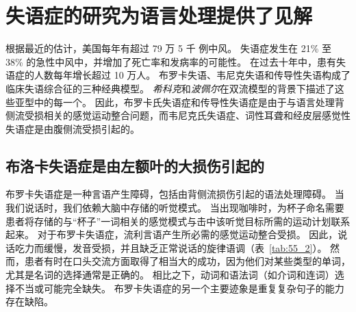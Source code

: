 \section{失语症的研究为语言处理提供了见解}

根据最近的估计，美国每年有超过 79 万 5 千 例中风。
失语症发生在 21\% 至 38\% 的急性中风中，并增加了死亡率和发病率的可能性。
在过去十年中，患有失语症的人数每年增长超过 10 万人。
布罗卡失语、韦尼克失语和传导性失语构成了临床失语综合征的三种经典模型。
\textit{希科克}和\textit{波佩尔}在双流模型的背景下描述了这些亚型中的每一个。
因此，布罗卡氏失语症和传导性失语症是由于与语言处理背侧流受损相关的感觉运动整合问题，而韦尼克氏失语症、词性耳聋和经皮层感觉性失语症是由腹侧流受损引起的。



\subsection{布洛卡失语症是由左额叶的大损伤引起的}

布罗卡失语症是一种言语产生障碍，包括由背侧流损伤引起的语法处理障碍。
当我们说话时，我们依赖大脑中存储的听觉模式。
当出现咖啡时，为杯子命名需要患者将存储的与“杯子”一词相关的感觉模式与击中该听觉目标所需的运动计划联系起来。
对于布罗卡失语症，流利言语产生所必需的感觉运动整合受损。
因此，说话吃力而缓慢，发音受损，并且缺乏正常说话的旋律语调（表~\ref{tab:55_2}）。
然而，患者有时在口头交流方面取得了相当大的成功，因为他们对某些类型的单词，尤其是名词的选择通常是正确的。
相比之下，动词和语法词（如介词和连词）选择不当或可能完全缺失。
布罗卡失语症的另一个主要迹象是重复复杂句子的能力存在缺陷。


